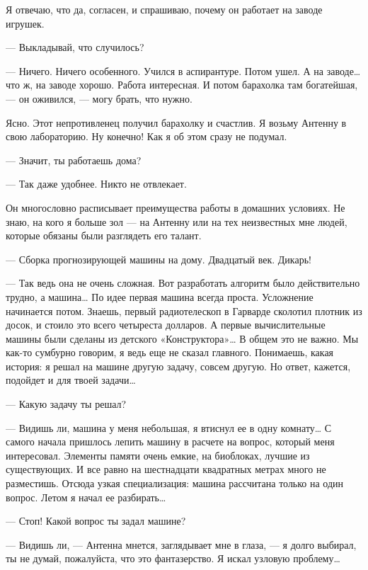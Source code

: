    Я отвечаю, что  да, согласен, и  спрашиваю, почему он  работает на  заводе
   игрушек.

   — Выкладывай, что случилось?

   — Ничего.  Ничего  особенного. Учился  в  аспирантуре. Потом  ушел.  А  на
   заводе… что ж, на заводе хорошо. Работа интересная. И потом барахолка  там
   богатейшая, — он оживился, — могу брать, что нужно.

   Ясно. Этот непротивленец получил барахолку и счастлив. Я возьму Антенну  в
   свою лабораторию. Ну конечно! Как я об этом сразу не подумал.

   — Значит, ты работаешь дома?

   — Так даже удобнее. Никто не отвлекает.

   Он многословно  расписывает преимущества  работы в  домашних условиях.  Не
   знаю, на кого я больше зол — на Антенну или на тех неизвестных мне  людей,
   которые обязаны были разглядеть его талант.

   — Сборка прогнозирующей машины на дому. Двадцатый век. Дикарь!

   —  Так  ведь  она  не   очень  сложная.  Вот  разработать  алгоритм   было
   действительно трудно,  а  машина… По  идее  первая машина  всегда  проста.
   Усложнение начинается  потом.  Знаешь,  первый  радиотелескоп  в  Гарварде
   сколотил плотник из досок, и стоило это всего четыреста долларов. А первые
   вычислительные машины были сделаны из детского «Конструктора»… В общем это
   не важно.  Мы как-то  сумбурно говорим,  я ведь  еще не  сказал  главного.
   Понимаешь, какая история: я решал на машине другую задачу, совсем  другую.
   Но ответ, кажется, подойдет и для твоей задачи…

   — Какую задачу ты решал?

   — Видишь ли,  машина у  меня небольшая,  я втиснул  ее в  одну комнату…  С
   самого начала пришлось  лепить машину  в расчете на  вопрос, который  меня
   интересовал.  Элементы  памяти  очень  емкие,  на  биоблоках,  лучшие   из
   существующих. И  все  равно  на шестнадцати  квадратных  метрах  много  не
   разместишь. Отсюда узкая специализация:  машина рассчитана только на  один
   вопрос. Летом я начал ее разбирать…

   — Стоп! Какой вопрос ты задал машине?

   — Видишь ли, — Антенна мнется, заглядывает мне в глаза, — я долго выбирал,
   ты не думай, пожалуйста, что это фантазерство. Я искал узловую проблему…

